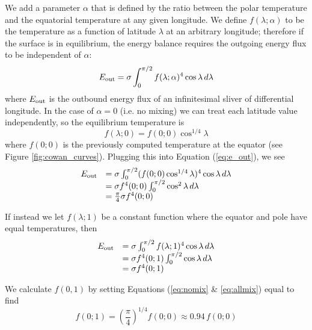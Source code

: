\documentclass[linenumbers,preprint,authoryear]{elsarticle}
\begin{document}
We add a parameter $\alpha$ that is defined by the ratio between the polar temperature and the equatorial temperature at any given longitude. We define $f(\lambda;\alpha)$ to be the temperature as a function of latitude $\lambda$ at an arbitrary longitude; therefore if the surface is in equilibrium, the energy balance requires the outgoing energy flux to be independent of $\alpha$:
\begin{equation}
    \label{eq:e_out}
    E_{\rm out} = \sigma \int_0^{\pi/2} f(\lambda; \alpha)^4 \cos{\lambda}\,d\lambda
\end{equation}
where $E_{\rm out}$ is the outbound energy flux of an infinitesimal sliver of differential longitude. In the case of $\alpha=0$ (i.e. no mixing) we can treat each latitude value independently, so the equilibrium temperature is
\begin{equation}
    f(\lambda; 0) = f(0;0) \cos^{1/4}{\lambda}
\end{equation}
where $f(0;0)$ is the previously computed temperature at the equator (see Figure \ref{fig:cowan_curves}). Plugging this into Equation (\ref{eq:e_out}), we see
\begin{equation}
    \label{eq:nomix}
    \begin{array}{cl}
        E_{\rm out} & = \sigma \int_0^{\pi/2} (f(0;0) \cos^{1/4}{\lambda})^4\cos{\lambda}\,d\lambda \\
        & = \sigma f^4(0;0) \int_0^{\pi/2} \cos^{2}{\lambda}\,d\lambda \\
        & = \frac{\pi}{4}\sigma f^4(0;0)
    \end{array}
\end{equation}

If instead we let $f(\lambda;1)$ be a constant function where the equator and pole have equal temperatures, then
\begin{equation}
    \label{eq:allmix}
    \begin{array}{cl}
        E_{\rm out} & = \sigma \int_0^{\pi/2} f(\lambda;1)^4 \cos{\lambda}\,d\lambda \\
        & = \sigma f^4(0;1) \int_0^{\pi/2} \cos{\lambda}\,d\lambda \\
        & = \sigma f^4(0;1)
    \end{array}
\end{equation}

We calculate $f(0,1)$ by setting Equations (\ref{eq:nomix} \& \ref{eq:allmix}) equal to find
\begin{equation}
    f(0;1) = \left(\frac{\pi}{4}\right)^{1/4} f(0;0) \approx 0.94 \,f(0;0)
\end{equation}
\end{document}

